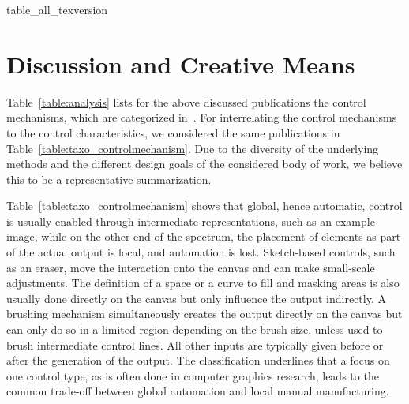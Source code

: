 
{table_all_texversion}


\section{Discussion and Creative Means}
\label{sec:discussion_creative_means}

Table~\ref{table:analysis} lists for the above discussed publications the control mechanisms, which are categorized in~. For interrelating the control mechanisms to the control characteristics, we considered the same publications in Table~\ref{table:taxo_controlmechanism}. Due to the diversity of the underlying methods and the different design goals of the considered body of work, we believe this to be a representative summarization.


Table~\ref{table:taxo_controlmechanism} shows that global, hence automatic, control is usually enabled through intermediate representations, such as an example image, while on the other end of the spectrum, the placement of elements as part of the actual output is local, and automation is lost.  Sketch-based controls, such as an eraser, move the interaction onto the canvas and can make small-scale adjustments. The definition of a space or a curve to fill and masking areas is also usually done directly on the canvas but only influence the output indirectly. A brushing mechanism simultaneously creates the output directly on the canvas but can only do so in a limited region depending on the brush size, unless used to brush intermediate control lines. All other inputs are typically given before or after the generation of the output. The classification underlines that a focus on one control type, as is often done in computer graphics research, leads to the common trade-off between global automation and local manual manufacturing.

